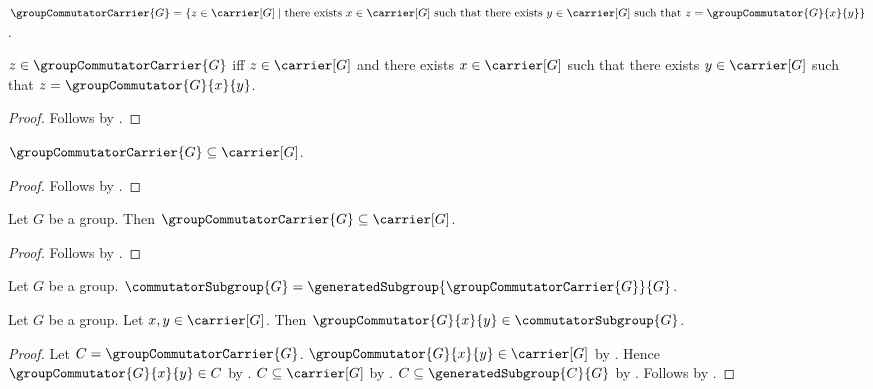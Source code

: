 \begin{definition}\label{group_commutator_carrier}
    $\groupCommutatorCarrier{G}=
        \{z\in\carrier[G]\mid
            \text{there exists $x\in\carrier[G]$ such that there exists
                $y\in\carrier[G]$ such that
                $z=\groupCommutator{G}{x}{y}$}\}$.
\end{definition}

\begin{proposition}\label{group_commutator_carrier_iff}
    $z\in\groupCommutatorCarrier{G}$ iff
        $z\in\carrier[G]$ and there exists $x\in\carrier[G]$ such that
            there exists $y\in\carrier[G]$ such that
                $z=\groupCommutator{G}{x}{y}$.
\end{proposition}
\begin{proof}
    Follows by .
\end{proof}

\begin{proposition}\label{group_commutator_carrier_subseteq}
    $\groupCommutatorCarrier{G}\subseteq\carrier[G]$.
\end{proposition}
\begin{proof}
    Follows by .
\end{proof}

\begin{classification}\label{group_commutator_carrier_is_subset_in_group}
    Let $G$ be a group.
    Then $\groupCommutatorCarrier{G}\subseteq\carrier[G]$.
\end{classification}
\begin{proof}
    Follows by .
\end{proof}

\begin{definition}\label{commutator_subgroup}
    Let $G$ be a group.
    $\commutatorSubgroup{G}=
        \generatedSubgroup{\groupCommutatorCarrier{G}}{G}$.
\end{definition}

\begin{proposition}\label{commutator_subgroup_contains_commutators}
    Let $G$ be a group.
    Let $x,y\in\carrier[G]$.
    Then $\groupCommutator{G}{x}{y}\in\commutatorSubgroup{G}$.
\end{proposition}
\begin{proof}
    Let $C=\groupCommutatorCarrier{G}$.
    $\groupCommutator{G}{x}{y}\in\carrier[G]$ by
        .
    Hence $\groupCommutator{G}{x}{y}\in C$ by
        .
    $C\subseteq\carrier[G]$ by
        .
    $C\subseteq\generatedSubgroup{C}{G}$ by
        .
    Follows by .
\end{proof}

